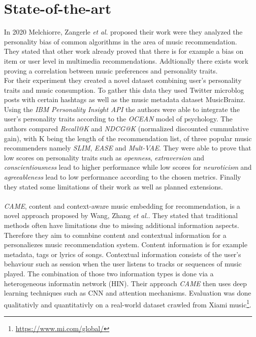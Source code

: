 \documentclass[runningheads,a4paper]{llncs}
\begin{document}
\section{State-of-the-art}
In 2020 Melchiorre, Zangerle \textit{et al.} proposed their work were they analyzed the personality bias of common algorithms in the area of music recommendation.
They stated that other work already proved that there is for example a bias on item or user level in multimedia recommendations. 
Addtionally there exists work proving a correlation between music preferences and personality traits.\\
For their experiment they created a novel dataset combining user's personality traits and music consumption.
To gather this data they used Twitter microblog posts with certain hashtags as well as the music metadata dataset MusicBrainz. 
Using the \textit{IBM Personality Insight API} the authors were able to integrate the user's personality traits according to the \textit{OCEAN} model of psychology.
The authors compared \textit{Recall@K} and \textit{NDCG@K} (normalized discounted cummulative gain), with K being the length of the recommendation list, of three popular music recommenders namely \textit{SLIM}, \textit{EASE} and \textit{Mult-VAE}.
They were able to prove that low scores on personality traits such as \textit{openness}, \textit{extraversion} and \textit{conscientiousness} lead to higher performance
while low scores for \textit{neuroticism} and \textit{agreeableness} lead to low performance according to the chosen metrics. 
Finally they stated some limitations of their work as well as planned extensions. \cite{melchiorre2020personality}\\
\\
\textit{CAME}, content and context-aware music embedding for recommendation, is a novel approach proposed by Wang, Zhang \textit{et al.}.
They stated that traditional methods often have limitations due to missing additional information aspects. 
Therefore they aim to comnbine content and contextual information for a personaliezes music recommendation system. 
Content information is for example metadata, tags or lyrics of songs. 
Contextual information consists of the user's behaviour such as session when the user listens to tracks or sequences of music played. 
The combination of those two information types is done via a heterogeneous informatin network (HIN).
Their approach \textit{CAME} then uses deep learning techniques such as CNN and attention mechanisms.
Evaluation was done qualitativly and quantitativly on a real-world dataset crawled from Xiami music\footnote{\url{https://www.mi.com/global/}}. 
\end{document}
